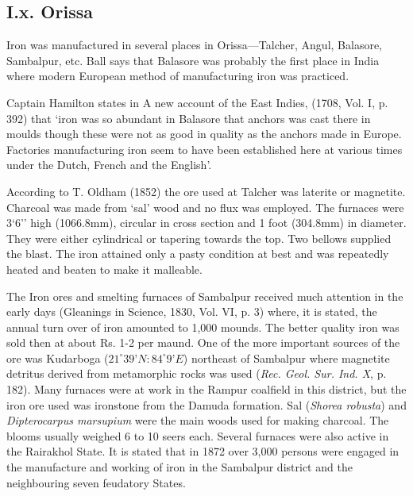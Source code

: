 \vspace{-.3cm}

\subsection*{I.x.  Orissa}\label{subsection-10}

\vspace{-.2cm}

Iron was manufactured in several places in Orissa—Talcher, Angul, Balasore, Sambalpur, etc. Ball says that Balasore was probably the first place in India where modern European method of manufacturing iron was practiced.

Captain Hamilton states in A new account of the East Indies, (1708, Vol. I, p. 392) that ‘iron was so abundant in Balasore that anchors was cast there in moulds though these were not as good in quality as the anchors made in Europe. Factories manufacturing iron seem to have been established here at various times under the Dutch, French and the English’. 

According to T. Oldham (1852) the ore used at Talcher was laterite or magnetite. Charcoal was made from ‘sal’ wood and no flux was employed. The furnaces were 3`6'' high (1066.8mm), circular in cross section and 1 foot (304.8mm) in diameter. They were either cylindrical or tapering towards the top. Two bellows supplied the blast. The iron attained only a pasty condition at best and was repeatedly heated and beaten to make it malleable.

The Iron ores and smelting furnaces of Sambalpur received much attention in the early days (Gleanings in Science, 1830, Vol. VI, p. 3) where, it is stated, the annual turn over of iron amounted to 1,000 mounds. The better quality iron was sold then at about Rs. 1-2 per maund. One of the more important sources of the ore was Kudarboga ($21^\circ 39’N: 84^\circ 9’E$) northeast of Sambalpur where magnetite detritus derived from metamorphic rocks was used ({\it Rec. Geol. Sur. Ind. X}, p. 182). Many furnaces were at work in the Rampur coalfield in this district, but the iron ore used was ironstone from the Damuda formation. Sal ({\it Shorea robusta}) and {\it Dipterocarpus marsupium} were the main woods used for making charcoal. The blooms usually weighed 6 to 10 seers each. Several furnaces were also active in the Rairakhol State. It is stated that in 1872 over 3,000 persons were engaged in the manufacture and working of iron in the Sambalpur district and the neighbouring seven feudatory States.

